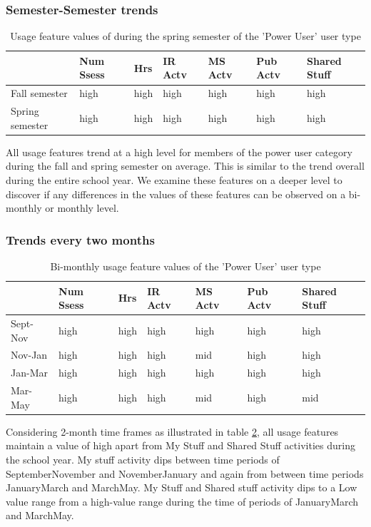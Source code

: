 \documentclass{acm_proc_article-sp}
\begin{document}
\subsubsection{Semester-Semester trends}

\begin{table}
\caption{Usage feature values of during the spring semester of the 'Power User' user type}
\label{cluster1month}
\begin{tabular}{|p{1.5cm}|p{0.6cm}|p{0.6cm}|p{0.6cm}|p{0.6cm}|p{0.8cm}|p{0.8cm}|}
 & Num Ssess & Hrs & IR Actv & MS Actv & Pub Actv & Shared Stuff \\ \hline
Fall  semester & high & high  & high & high & high & high \\ \hline
Spring semester & high & high  & high & high & high & high \\ \hline
\end{tabular}
\end{table}

All usage features trend at a high level for members of the power user category during the fall and spring semester on average. This is similar to the trend overall during the entire school year. We examine these features on a deeper level to discover if any differences in the values of these features can be observed on a bi-monthly or monthly level.

\subsubsection{Trends every two months}
\begin{table}
\caption{Bi-monthly usage feature values of the 'Power User' user type}
\label{cluster1bimonthly}
\begin{tabular}{|p{1.5cm}|p{0.6cm}|p{0.6cm}|p{0.6cm}|p{0.6cm}|p{0.8cm}|p{0.8cm}|}
 & Num Ssess & Hrs & IR Actv & MS Actv & Pub Actv & Shared Stuff \\ \hline
Sept-Nov & high & high  & high & high & high & high \\ \hline
Nov-Jan & high & high  & high & mid & high & high \\ \hline
Jan-Mar & high & high  & high & high & high & high \\ \hline
Mar-May & high & high  & high & mid & high & mid \\ \hline
\end{tabular}
\end{table}

Considering 2-month time frames as illustrated in table \ref{cluster1bimonthly}, all usage features maintain a value of high apart from My Stuff and Shared Stuff activities during the school year. My stuff activity dips between time periods of September\-November and November\-January and again from between time periods January\-March and March\-May.
My Stuff and Shared stuff activity dips to a Low value range from a high-value range during the time of periods of January\-March and March\-May.
\end{document}
